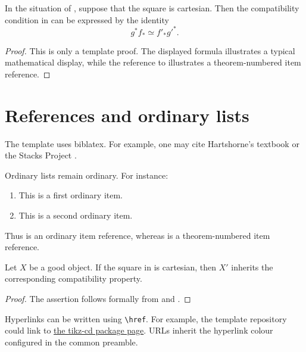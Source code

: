 \begin{lemma}
    \label{lemma:base-change}
    In the situation of , suppose that the square is
    cartesian. Then the compatibility condition in
     can be expressed by the identity
    \begin{equation}
        \label{equation:pull-back}
        g^* f_* \simeq f'_* {g'}^* .
    \end{equation}
\end{lemma}

\begin{proof}
    This is only a template proof. The displayed formula illustrates a typical
    mathematical display, while the reference to
     illustrates a theorem-numbered item reference.
\end{proof}

\section{References and ordinary lists}

The template uses biblatex. For example, one may cite
Hartshorne's textbook \cite{har77} or the Stacks Project \cite{stacks}.

Ordinary lists remain ordinary. For instance:
\begin{enumerate}[label=(\alph*), ref=(\alph*)]
    \item This is a first ordinary item.
        \label{item:ordinary-first} 
    \item This is a second ordinary item.
        \label{item:ordinary-second} 
\end{enumerate}
Thus  is an ordinary item reference, whereas
 is a theorem-numbered item reference.

\begin{proposition}
    \label{proposition:main}
    Let \(X\) be a good object. If the square in  is
    cartesian, then \(X'\) inherits the corresponding compatibility property.
\end{proposition}

\begin{proof}
    The assertion follows formally from  and
    .
\end{proof}


\begin{remark}
    \label{remark:links}
    Hyperlinks can be written using \verb|\href|. For example, the template
    repository could link to
    \href{https://www.ctan.org/pkg/tikz-cd}{the tikz-cd package page}.
    URLs inherit the hyperlink colour configured in the common preamble.
\end{remark}


\printbibliography

\par
\vfill
\setlength{\parindent}{0pt}


